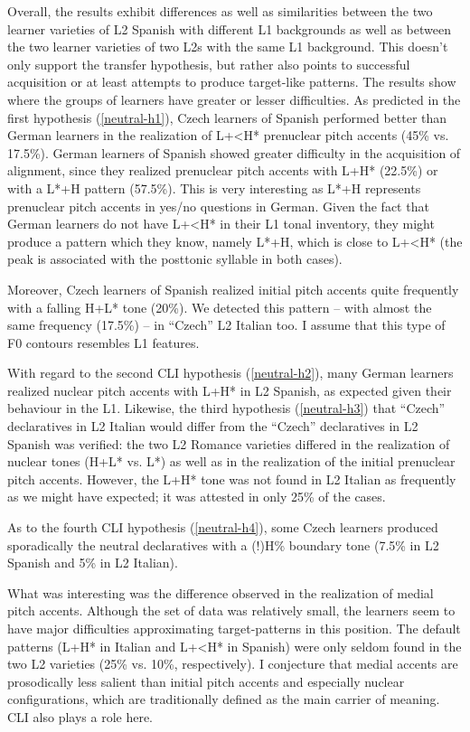 Overall, the results exhibit differences as well as similarities between the two learner varieties of L2 Spanish with different L1 backgrounds as well as between the two learner varieties of two L2s with the same L1 background. This doesn't only support the transfer hypothesis, but rather also points to successful acquisition or at least attempts to produce target-like patterns. The results show where the groups of learners have greater or lesser difficulties. As predicted in the first hypothesis (\ref{neutral-h1}), Czech learners of Spanish performed better than German learners in the realization of L+<H* prenuclear pitch accents (45\% vs. 17.5\%). German learners of Spanish showed greater difficulty in the acquisition of alignment, since they realized prenuclear pitch accents with L+H* (22.5\%) or with a L*+H pattern (57.5\%). This is very interesting as L*+H represents prenuclear pitch accents in yes/no questions in German. Given the fact that German learners do not have L+<H* in their L1 tonal inventory, they might produce a pattern which they know, namely L*+H, which is close to L+<H* (the peak is associated with the posttonic syllable in both cases).


Moreover, Czech learners of Spanish realized initial pitch accents quite frequently with a falling H+L* tone (20\%). We detected this pattern -- with almost the same frequency (17.5\%) -- in “Czech” L2 Italian too. I assume that this type of F0 contours resembles L1 features.



With regard to the second CLI hypothesis (\ref{neutral-h2}), many German learners realized nuclear pitch accents with L+H* in L2 Spanish, as expected given their behaviour in the L1. Likewise, the third hypothesis (\ref{neutral-h3}) that “Czech” declaratives in L2 Italian would differ from the “Czech” declaratives in L2 Spanish was verified: the two L2 Romance varieties differed in the realization of nuclear tones (H+L* vs. L*) as well as in the realization of the initial prenuclear pitch accents. However, the L+H* tone was not found in L2 Italian as frequently as we might have expected; it was attested in only 25\% of the cases.



As to the fourth CLI hypothesis (\ref{neutral-h4}), some Czech learners produced sporadically the neutral declaratives with a (!)H\% boundary tone (7.5\% in L2 Spanish and 5\% in L2 Italian).



What was interesting was the difference observed in the realization of medial pitch accents. Although the set of data was relatively small, the learners seem to have major difficulties approximating target-patterns in this position. The default patterns (L+H* in Italian and L+<H* in Spanish) were only seldom found in the two L2 varieties (25\% vs. 10\%, respectively). I conjecture that medial accents are prosodically less salient than initial pitch accents and especially nuclear configurations, which are traditionally defined as the main carrier of meaning. CLI also plays a role here.


